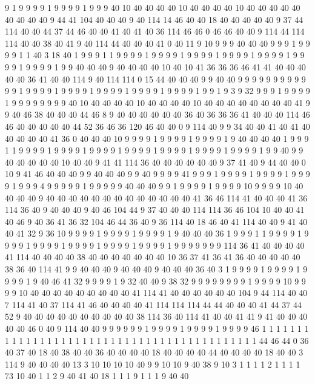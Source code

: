 9 1 9 9 9 9 1 9 9 9 9 1 9 9 9 40 10 40 40 40
40 10 40 40 40 40 10 40 40 40 40 40 40 40 40 40 9 44 41 104
40 40 40 9 40 114 14 46 40 40 18 40 40 40 40 40 9 37 44 114
40 40 44 37 44 46 40 40 41 40 41 40 36 114 46 46 0 46 46 40
40 9 114 44 114 114 40 40 38 40 41 9 40 114 44 40 40 40 41 0
40 11 9 10 9 9 9 40 40 40 9 9 9 1 9 9 9 9 1 1
40 3 18 40 1 9 9 9 1 1 9 9 9 9 1 9 9 9 9 1
9 9 9 9 1 9 9 9 9 1 9 9 9 9 1 9 9 9 9 1
9 9 9 9 1 9 9 40 40 40 9 40 40 40 40 10 40 10 41 36
36 36 46 41 41 40 40 40 40 40 36 41 40 40 114 9 40 114 114 0
15 44 40 40 40 9 9 40 40 9 9 9 9 9 9 9 9 9 9 9
9 1 9 9 9 9 1 9 9 9 9 1 9 9 9 9 1 9 9 9
9 1 9 9 9 9 1 9 9 1 9 3 9 32 9 9 9 1 9 9
9 9 1 9 9 9 9 9 9 9 9 40 10 40 40 40 40 10 40 40
40 40 10 40 40 40 40 40 40 40 40 41 9 9 40 46 38 40 40 40
44 46 8 9 40 40 40 40 40 40 36 40 36 36 36 41 40 40 40 114
46 46 40 40 40 40 40 44 52 36 46 36 120 46 40 40 0 9 114 40
9 9 34 40 40 41 40 41 40 40 40 40 40 41 36 0 40 40 40 10
9 9 9 9 1 9 9 9 9 1 9 9 9 9 1 9 40 40 40 40
1 9 9 9 1 1 9 9 9 9 1 9 9 9 9 1 9 9 9 9
1 9 9 9 9 1 9 9 9 9 1 9 9 9 9 1 9 9 9 9
1 9 9 40 9 9 40 40 40 40 40 10 40 40 9 41 41 114 36 40
40 40 40 40 40 9 37 41 40 9 44 40 40 0 10 9 41 46 40 40
40 9 9 40 40 40 9 9 40 9 9 9 9 41 9 9 9 1 9 9
9 9 1 9 9 9 9 1 9 9 9 9 1 9 9 9 4 9 9 9
9 9 1 9 9 9 9 9 40 40 40 9 9 1 9 9 9 9 1 9
9 9 9 10 9 9 9 9 10 40 40 40 40 9 40 40 40 40 40 40
40 40 40 40 40 40 40 41 36 46 114 41 40 40 40 41 36 114 36 40
9 40 40 40 9 40 46 104 44 9 37 40 40 40 114 114 36 46 104 10
40 40 41 40 46 9 40 36 41 36 32 104 46 44 36 40 9 36 114 40
18 46 40 41 114 40 40 9 41 40 40 41 32 9 36 10 9 9 9 9
1 9 9 9 9 1 9 9 9 9 1 9 40 40 40 36 1 9 9 9
1 1 9 9 9 9 1 9 9 9 9 1 9 9 9 9 1 9 9 9
9 1 9 9 9 9 1 9 9 9 9 1 9 9 9 9 9 9 9 114
36 41 40 40 40 40 41 114 40 40 40 40 38 40 40 40 40 40 40 40
10 36 37 41 36 41 36 40 40 40 40 40 38 36 40 114 41 9 9 40
40 40 9 40 40 40 9 40 40 40 36 40 3 1 9 9 9 9 1 9
9 9 9 1 9 9 9 9 1 9 40 46 41 32 9 9 9 9 1 9
32 40 40 9 38 32 9 9 9 9 9 9 9 9 1 9 9 9 9 10
9 9 9 9 10 40 40 40 40 40 40 40 40 40 41 114 41 40 40 40
40 40 40 104 9 44 114 40 40 7 114 41 40 37 114 41 46 40 40 40
40 41 114 114 114 44 44 40 40 40 41 44 37 44 52 9 40 40 40 40
40 40 40 40 40 40 38 114 36 40 114 41 40 40 41 41 9 41 40 40
40 40 40 46 0 40 9 114 40 40 9 9 9 9 9 9 1 9 9 9
9 1 9 9 9 9 1 9 9 9 9 46 1 1 1 1 1 1 1 1
1 1 1 1 1 1 1 1 1 1 1 1 1 1 1 1 1 1 1 1
1 1 1 1 1 1 1 1 1 1 1 1 1 1 1 44 46 44 0 36
40 37 40 18 40 38 40 40 36 40 40 40 40 18 40 40 40 40 44 40
40 40 40 18 40 40 3 114 9 40 40 40 40 13 3 10 10 10 10 40
9 9 10 10 9 40 38 9 10 3 1 1 1 1 2 1 1 1 1 73
10 40 1 1 2 9 40 41 40 18 1 1 1 9 1 1 1 9 40 40
